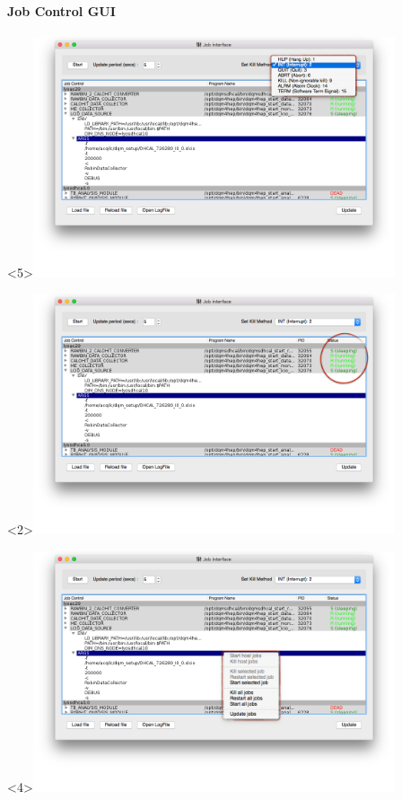 \documentclass[8pt]{beamer}
\begin{document}
       
  \begin{frame}
    \frametitle{\secname}
    \framesubtitle{ Job Control GUI }

      \begin{overlayarea}{\textwidth}{\textheight}
      	\begin{center}
        		\begin{onlyenv}<5>\includegraphics[width=0.8\textwidth]{figs/JobInterface/JobInterface_KillSwitch.png}\end{onlyenv}
       		\begin{onlyenv}\includegraphics[width=0.8\textwidth]{figs/JobInterface/JobInterface_LiveStatus.png}\end{onlyenv}
        		\begin{onlyenv}<4>\includegraphics[width=0.8\textwidth]{figs/JobInterface/JobInterface_Module.png}\end{onlyenv}

\end{center}
\end{overlayarea}
\end{frame}
\end{document}
